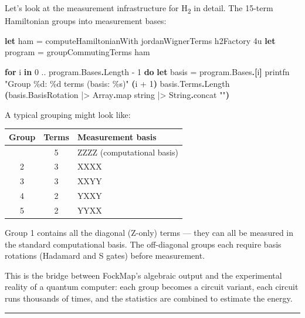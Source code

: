\documentclass[
  11pt,
  oneside]{book}
\newenvironment{Shaded}{\begin{snugshade}}{\end{snugshade}}
\newcommand{\DataTypeTok}[1]{\textcolor[rgb]{0.13,0.29,0.53}{#1}}
\newcommand{\DecValTok}[1]{\textcolor[rgb]{0.00,0.00,0.81}{#1}}
\newcommand{\KeywordTok}[1]{\textcolor[rgb]{0.13,0.29,0.53}{\textbf{#1}}}
\newcommand{\NormalTok}[1]{#1}
\newcommand{\OperatorTok}[1]{\textcolor[rgb]{0.81,0.36,0.00}{\textbf{#1}}}
\newcommand{\StringTok}[1]{\textcolor[rgb]{0.31,0.60,0.02}{#1}}
\begin{document}
Let's look at the measurement infrastructure for H\textsubscript{2} in detail. The
15-term Hamiltonian groups into measurement bases:

\begin{Shaded}
\begin{Highlighting}[]
\KeywordTok{let}\NormalTok{ ham = computeHamiltonianWith jordanWignerTerms h2Factory }\DecValTok{4}\NormalTok{u}
\KeywordTok{let}\NormalTok{ program = groupCommutingTerms ham}

\KeywordTok{for}\NormalTok{ i }\KeywordTok{in} \DecValTok{0}\NormalTok{ .. program.Bases}\KeywordTok{.}\NormalTok{Length {-} }\DecValTok{1} \KeywordTok{do}
    \KeywordTok{let}\NormalTok{ basis = program.Bases}\KeywordTok{.}\OperatorTok{[}\NormalTok{i}\OperatorTok{]}
\NormalTok{    printfn }\StringTok{"Group \%d: \%d terms  (basis: \%s)"}
        \OperatorTok{(}\NormalTok{i + }\DecValTok{1}\OperatorTok{)}
\NormalTok{        basis.Terms}\KeywordTok{.}\NormalTok{Length}
        \OperatorTok{(}\NormalTok{basis.BasisRotation |\textgreater{} Array}\KeywordTok{.}\NormalTok{map }\DataTypeTok{string}\NormalTok{ |\textgreater{} String}\KeywordTok{.}\NormalTok{concat }\StringTok{""}\OperatorTok{)}
\end{Highlighting}
\end{Shaded}

A typical grouping might look like:

\begin{longtable}[]{@{}ccl@{}}
\toprule\noalign{}
Group & Terms & Measurement basis \\
\midrule\noalign{}
\endhead
\bottomrule\noalign{}
\endlastfoot
1 & 5 & ZZZZ (computational basis) \\
2 & 3 & XXXX \\
3 & 3 & XXYY \\
4 & 2 & YXXY \\
5 & 2 & YYXX \\
\end{longtable}

Group 1 contains all the diagonal (Z-only) terms --- they can all be
measured in the standard computational basis. The off-diagonal groups
each require basis rotations (Hadamard and S gates) before measurement.

This is the bridge between FockMap's algebraic output and the
experimental reality of a quantum computer: each group becomes a circuit
variant, each circuit runs thousands of times, and the statistics are
combined to estimate the energy.

\begin{center}\rule{0.5\linewidth}{0.5pt}\end{center}
\end{document}
